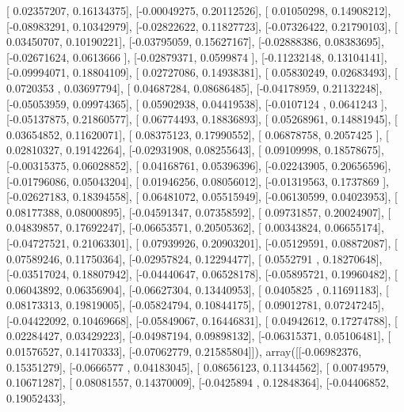\documentclass{article}
\begin{document}
       [ 0.02357207,  0.16134375],
       [-0.00049275,  0.20112526],
       [ 0.01050298,  0.14908212],
       [-0.08983291,  0.10342979],
       [-0.02822622,  0.11827723],
       [-0.07326422,  0.21790103],
       [ 0.03450707,  0.10190221],
       [-0.03795059,  0.15627167],
       [-0.02888386,  0.08383695],
       [-0.02671624,  0.0613666 ],
       [-0.02879371,  0.0599874 ],
       [-0.11232148,  0.13104141],
       [-0.09994071,  0.18804109],
       [ 0.02727086,  0.14938381],
       [ 0.05830249,  0.02683493],
       [ 0.0720353 ,  0.03697794],
       [ 0.04687284,  0.08686485],
       [-0.04178959,  0.21132248],
       [-0.05053959,  0.09974365],
       [ 0.05902938,  0.04419538],
       [-0.0107124 ,  0.0641243 ],
       [-0.05137875,  0.21860577],
       [ 0.06774493,  0.18836893],
       [ 0.05268961,  0.14881945],
       [ 0.03654852,  0.11620071],
       [ 0.08375123,  0.17990552],
       [ 0.06878758,  0.2057425 ],
       [ 0.02810327,  0.19142264],
       [-0.02931908,  0.08255643],
       [ 0.09109998,  0.18578675],
       [-0.00315375,  0.06028852],
       [ 0.04168761,  0.05396396],
       [-0.02243905,  0.20656596],
       [-0.01796086,  0.05043204],
       [ 0.01946256,  0.08056012],
       [-0.01319563,  0.1737869 ],
       [-0.02627183,  0.18394558],
       [ 0.06481072,  0.05515949],
       [-0.06130599,  0.04023953],
       [ 0.08177388,  0.08000895],
       [-0.04591347,  0.07358592],
       [ 0.09731857,  0.20024907],
       [ 0.04839857,  0.17692247],
       [-0.06653571,  0.20505362],
       [ 0.00343824,  0.06655174],
       [-0.04727521,  0.21063301],
       [ 0.07939926,  0.20903201],
       [-0.05129591,  0.08872087],
       [ 0.07589246,  0.11750364],
       [-0.02957824,  0.12294477],
       [ 0.0552791 ,  0.18270648],
       [-0.03517024,  0.18807942],
       [-0.04440647,  0.06528178],
       [-0.05895721,  0.19960482],
       [ 0.06043892,  0.06356904],
       [-0.06627304,  0.13440953],
       [ 0.0405825 ,  0.11691183],
       [ 0.08173313,  0.19819005],
       [-0.05824794,  0.10844175],
       [ 0.09012781,  0.07247245],
       [-0.04422092,  0.10469668],
       [-0.05849067,  0.16446831],
       [ 0.04942612,  0.17274788],
       [ 0.02284427,  0.03429223],
       [-0.04987194,  0.09898132],
       [-0.06315371,  0.05106481],
       [ 0.01576527,  0.14170333],
       [-0.07062779,  0.21585804]]), array([[-0.06982376,  0.15351279],
       [-0.0666577 ,  0.04183045],
       [ 0.08656123,  0.11344562],
       [ 0.00749579,  0.10671287],
       [ 0.08081557,  0.14370009],
       [-0.0425894 ,  0.12848364],
       [-0.04406852,  0.19052433],
\end{document}
